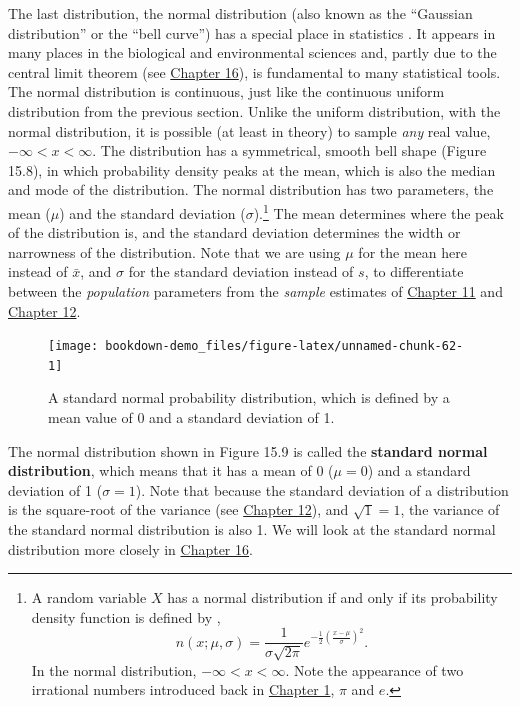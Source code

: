\documentclass[
]{scrbook}
\begin{document}
The last distribution, the normal distribution (also known as the ``Gaussian distribution'' or the ``bell curve'') has a special place in statistics \citep{Miller2004, Navarro2022}.
It appears in many places in the biological and environmental sciences and, partly due to the central limit theorem (see \protect\hyperlink{Chapter_16}{Chapter 16}), is fundamental to many statistical tools.
The normal distribution is continuous, just like the continuous uniform distribution from the previous section.
Unlike the uniform distribution, with the normal distribution, it is possible (at least in theory) to sample \emph{any} real value, \(-\infty < x < \infty\).
The distribution has a symmetrical, smooth bell shape (Figure 15.8), in which probability density peaks at the mean, which is also the median and mode of the distribution.
The normal distribution has two parameters, the mean (\(\mu\)) and the standard deviation (\(\sigma\)).\footnote{A random variable \(X\) has a normal distribution if and only if its probability density function is defined by \citep{Miller2004}, \[n\left(x; \mu, \sigma\right) = \frac{1}{\sigma\sqrt{2\pi}}e^{-\frac{1}{2}\left(\frac{x - \mu}{\sigma}\right)^{2}}.\] In the normal distribution, \(-\infty < x < \infty\). Note the appearance of two irrational numbers introduced back in \protect\hyperlink{Chapter_1}{Chapter 1}, \(\pi\) and \(e\).}
The mean determines where the peak of the distribution is, and the standard deviation determines the width or narrowness of the distribution.
Note that we are using \(\mu\) for the mean here instead of \(\bar{x}\), and \(\sigma\) for the standard deviation instead of \(s\), to differentiate between the \emph{population} parameters from the \emph{sample} estimates of \protect\hyperlink{Chapter_11}{Chapter 11} and \protect\hyperlink{Chapter_12}{Chapter 12}.

\begin{figure}
\texttt{[image: bookdown-demo\_files/figure-latex/unnamed-chunk-62-1]} \caption{A standard normal probability distribution, which is defined by a mean value of 0 and a standard deviation of 1.}\label{fig:unnamed-chunk-62}
\end{figure}

The normal distribution shown in Figure 15.9 is called the \textbf{standard normal distribution}, which means that it has a mean of 0 (\(\mu = 0\)) and a standard deviation of 1 (\(\sigma = 1\)).
Note that because the standard deviation of a distribution is the square-root of the variance (see \protect\hyperlink{Chapter_12}{Chapter 12}), and \(\sqrt{1} = 1\), the variance of the standard normal distribution is also 1.
We will look at the standard normal distribution more closely in \protect\hyperlink{Chapter_16}{Chapter 16}.
\end{document}
